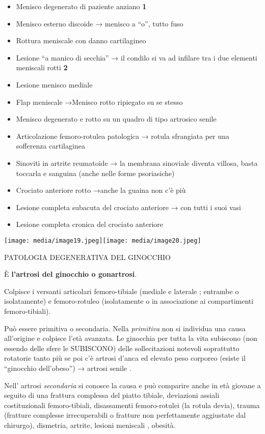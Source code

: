 \documentclass[]{article}
\begin{document}
\begin{itemize}
\item
  Menisco degenerato di paziente anziano \textbf{1}
\item
  Menisco esterno discoide → menisco a ``o'', tutto fuso
\item
  Rottura meniscale con danno cartilagineo
\item
  Lesione ``a manico di secchia'' → il condilo si va ad infilare tra i
  due elementi meniscali rotti \textbf{2}
\item
  Lesione menisco mediale
\item
  Flap meniscale →Menisco rotto ripiegato su se stesso
\item
  Menisco degenerato e rotto su un quadro di tipo artrosico senile
\item
  Articolazione femoro-rotulea patologica → rotula sfrangiata per una
  sofferenza cartilaginea
\item
  Sinoviti in artrite reumatoide → la membrana sinoviale diventa
  villosa, basta toccarla e sanguina (anche nelle forme psoriasiche)
\item
  Crociato anteriore rotto →anche la guaina non c'è più
\item
  Lesione completa subacuta del crociato anteriore → con tutti i suoi
  vasi
\item
  Lesione completa cronica del crociato anteriore
\end{itemize}

\texttt{[image: media/image19.jpeg]}\texttt{[image: media/image20.jpeg]}

PATOLOGIA DEGENERATIVA DEL GINOCCHIO

È \textbf{l'artrosi del ginocchio o gonartrosi}.

Colpisce i versanti articolari femoro-tibiale (mediale e laterale ;
entrambe o isolatamente) e femoro-rotuleo (isolatamente o in
associazione ai compartimenti femoro-tibiali).

Può essere primitiva o secondaria. Nella \emph{primitiva} non si
individua una causa all'origine e colpisce l'età avanzata. Le ginocchia
per tutta la vita subiscono (non essendo delle sfere le SUBISCONO) delle
sollecitazioni notevoli soprattutto rotatorie tanto più se poi c'è
artrosi d'anca ed elevato peso corporeo (esiste il ``ginocchio
dell'obeso'') → artrosi senile .

Nell' artrosi \emph{secondaria} si conosce la causa e può comparire
anche in età giovane a seguito di una frattura complessa del piatto
tibiale, deviazioni assiali costituzionali femoro-tibiali, disassamenti
femoro-rotulei (la rotula devia), trauma (fratture complesse
irrecuperabili o fratture non perfettamente aggiustate dal chirurgo),
dismetria, artrite, lesioni meniscali , obesità.
\end{document}
